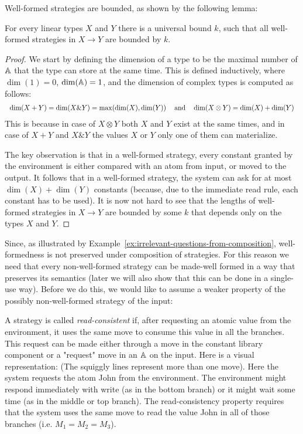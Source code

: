 \noindent
Well-formed strategies are bounded, as shown by the following lemma:
\begin{lemma}\label{lem:well-formed-bounded}
    For every linear types $X$ and $Y$ there is a universal bound $k$, such that all well-formed strategies in $X \to Y$ are bounded by $k$. 
\end{lemma}
\begin{proof}
    We start by defining the dimension of a type to be the maximal number of $\mathbb A$ that the type can store at the same time. This is defined inductively, 
    where $\dim(1) = 0$, $\dim(\mathbb A) = 1$, and the dimension of complex types is computed as follows:
    \[ \begin{tabular}{ccc}
        $\dim(X + Y) = \dim(X \& Y) = \max(\dim(X), \dim(Y))$ & and & $\dim(X \otimes Y) = \dim(X) + \dim(Y)$
    \end{tabular}
    \]
    This is because in case of $X \otimes Y$ both $X$ and $Y$ exist at the same times, and in case of $X + Y$ and $X \& Y$ the values $X$ or $Y$
    only one of them can materialize. 

    The key observation is that in a well-formed strategy, every constant granted by the environment is either compared with an atom from input, 
    or moved to the output. It follows that in a well-formed strategy, the system can ask for at most $\dim(X) + \dim(Y)$ constants
    (because, due to the immediate read rule, each constant has to be used). It is now not hard to see that the lengths of well-formed strategies 
    in $X \to Y$ are bounded by some $k$ that depends only on the types $X$ and $Y$.
\end{proof}

Since, as illustrated by Example~\ref{ex:irrelevant-questions-from-composition}, well-formedness is not preserved under composition of strategies. 
For this reason we need that every non-well-formed strategy can be made-well formed in a way that preserves its semantics (later we will also 
show that this can be done in a single-use way). Before we do this, we would like to assume a weaker property of the possibly non-well-formed strategy 
of the input:
\begin{definition}
    A strategy is called \emph{read-consistent} if, after requesting an atomic value from the environment, it uses the same move 
    to consume this value in all the branches. This request can be made either through a move in the constant
    library component or a "request" move in an $\mathbb A$ on the input. Here is a visual representation:
    (The squiggly lines represent more than one move). Here the system requests the atom John from the environment. 
    The environment might respond immediately with write (as in the bottom branch) or it might wait some time 
    (as in the middle or top branch). The read-consistency property requires that the system uses the same move to read 
    the value John in all of those branches (i.e. $M_1 = M_2 = M_3$). 
\end{definition}

